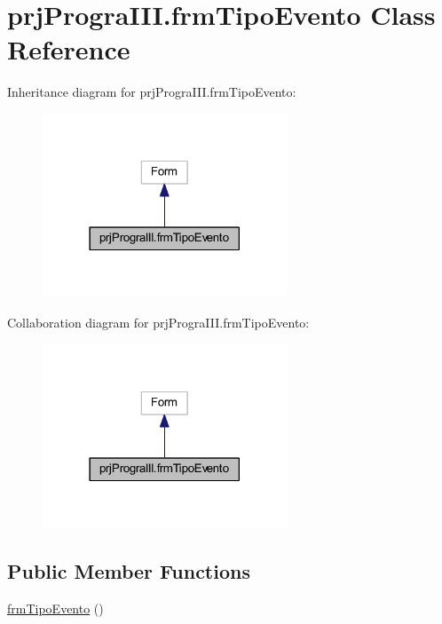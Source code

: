 \hypertarget{classprj_progra_i_i_i_1_1frm_tipo_evento}{}\section{prj\+Progra\+I\+I\+I.\+frm\+Tipo\+Evento Class Reference}
\label{classprj_progra_i_i_i_1_1frm_tipo_evento}


Inheritance diagram for prj\+Progra\+I\+I\+I.\+frm\+Tipo\+Evento\+:
\nopagebreak
\begin{figure}[H]
\begin{center}
\leavevmode
\includegraphics[width=206pt]{classprj_progra_i_i_i_1_1frm_tipo_evento__inherit__graph}
\end{center}
\end{figure}


Collaboration diagram for prj\+Progra\+I\+I\+I.\+frm\+Tipo\+Evento\+:
\nopagebreak
\begin{figure}[H]
\begin{center}
\leavevmode
\includegraphics[width=206pt]{classprj_progra_i_i_i_1_1frm_tipo_evento__coll__graph}
\end{center}
\end{figure}
\subsection*{Public Member Functions}
\begin{DoxyCompactItemize}
\item 
\hyperlink{classprj_progra_i_i_i_1_1frm_tipo_evento_a0c0ddf17875c0f054d4c38bb6793605e}{frm\+Tipo\+Evento} ()
\end{DoxyCompactItemize}
